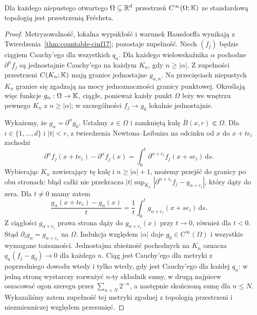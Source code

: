 \begin{twierdzenie}
\label{thm:frechet-cinf17}
Dla każdego niepustego otwartego $\Omega\subseteq\mathbb R^d$ przestrzeń
$C^\infty(\Omega;\mathbb K)$ ze standardową topologią jest przestrzenią
Frécheta.
\end{twierdzenie}
\begin{proof}
Metryzowalność, lokalna wypukłość i warunek Hausdorffa wynikają
z Twierdzenia~\ref{thm:countable-cinf17}; pozostaje zupełność.
Niech $(f_j)$ będzie ciągiem Cauchy'ego dla wszystkich $q_n$.
Dla każdego wielowskaźnika $\alpha$ pochodne
$\partial^\alpha f_j$ są jednostajnie Cauchy'ego na każdym
$K_n$, gdy $n\ge|\alpha|$. Z zupełności przestrzeni
$C(K_n;\mathbb K)$ mają granice jednostajne $g_{\alpha,n}$.
Na przecięciach niepustych $K_n$ granice się zgadzają
na mocy jednoznaczności granicy punktowej. Określają więc
funkcje $g_\alpha:\Omega\to\mathbb K$, ciągłe, ponieważ każdy punkt
$\Omega$ leży we wnętrzu pewnego $K_n$ z $n\ge|\alpha|$; w szczególności
$f_j\to g_0$ lokalnie jednostajnie.

Wykażemy, że $g_\alpha=\partial^\alpha g_0$.
Ustalmy $x\in\Omega$ i zamkniętą kulę $\overline B(x,r)\Subset\Omega$.
Dla $i\in\{1,\dots,d\}$ i $|t|<r$, z twierdzenia
Newtona--Leibniza na odcinku od $x$ do $x+te_i$ zachodzi
\[
 \partial^\alpha f_j(x+te_i)-\partial^\alpha f_j(x)
 =\int_0^t\partial^{\alpha+e_i}f_j(x+se_i)\,\mathrm ds.
\]
Wybierając $K_n$ zawierający tę kulę i $n\ge|\alpha|+1$,
możemy przejść do granicy po obu stronach: błąd całki
nie przekracza $|t|\sup_{K_n}|\partial^{\alpha+e_i}f_j-
g_{\alpha+e_i}|$, który dąży do zera. Dla $t\ne0$ mamy zatem
\[
\frac{g_\alpha(x+te_i)-g_\alpha(x)}{t}
=\frac1t\int_0^t g_{\alpha+e_i}(x+se_i)\,\mathrm ds.
\]
Z ciągłości $g_{\alpha+e_i}$ prawa strona dąży do
$g_{\alpha+e_i}(x)$ przy $t\to0$, również dla $t<0$.
Stąd $\partial_i g_\alpha=g_{\alpha+e_i}$ na $\Omega$.
Indukcja względem $|\alpha|$ daje $g_0\in C^\infty(\Omega)$
i wszystkie wymagane tożsamości. Jednostajna zbieżność
pochodnych na $K_n$ oznacza $q_n(f_j-g_0)\to0$ dla każdego $n$.
Ciąg jest Cauchy'ego dla metryki z poprzedniego dowodu
wtedy i tylko wtedy, gdy jest Cauchy'ego dla każdej $q_n$:
w jedną stronę wystarczy rozważyć $n$-ty składnik sumy,
w drugą najpierw oszacować ogon szeregu przez $\sum_{n>N}2^{-n}$,
a następnie skończoną sumę dla $n\le N$.
Wykazaliśmy zatem zupełność tej metryki zgodnej z topologią
przestrzeni i niezmienniczej względem przesunięć.
\end{proof}

